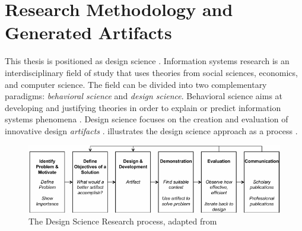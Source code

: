 \section{Research Methodology and Generated Artifacts}
\label{sec:intro-research-paradigm}

%	
%	

This thesis is positioned as design science \citep{Hevner2004}.
Information systems research is an interdisciplinary field of study that uses theories from social sciences, economics, and computer science. The field can be divided into two complementary paradigms: \emph{behavioral science} and \emph{design science}. Behavioral science aims at developing and justifying theories in order to explain or predict information systems phenomena \cite[]{Gregor2006}. Design science focuses on the creation and evaluation of innovative design \emph{artifacts} \cite[]{Hevner2004}.  illustrates the design science approach as a process \citep{Peffers2008}. 

\begin{figure}[h]
	\centering
	\includegraphics[width=\linewidth]{figures/DS-process}
	\caption[The Design Science Research process]{The Design Science Research process, adapted from \citep{Peffers2008}}
	\label{fig:DS-process}
\end{figure}


